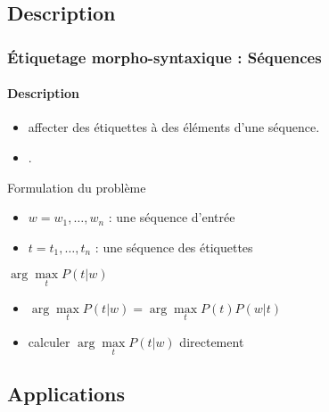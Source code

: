 \documentclass[xcolor=table]{beamer}
\begin{document}
\subsection{Description}

\begin{frame}
\frametitle{Étiquetage morpho-syntaxique : Séquences}
\framesubtitle{Description}


\begin{itemize}
	\item {} affecter des étiquettes à des éléments d'une séquence. 
	\item {} .
\end{itemize}

\begin{block}{Formulation du problème}
	\begin{itemize}
		\item $w = w_1, \ldots, w_n$ : une séquence d'entrée
		\item $t = t_1, \ldots, t_n$ : une séquence des étiquettes
	\end{itemize}
	\begin{center}
		$ \arg\max\limits_t P(t | w)$
	\end{center}
	
	\begin{itemize}
		\item {} $ \arg\max\limits_t P(t | w) = \arg\max\limits_t P(t) P(w | t) $
		\item {} calculer $\arg\max\limits_t P(t | w)$ directement
	\end{itemize}
\end{block}

\end{frame}

\subsection{Applications}
\end{document}
